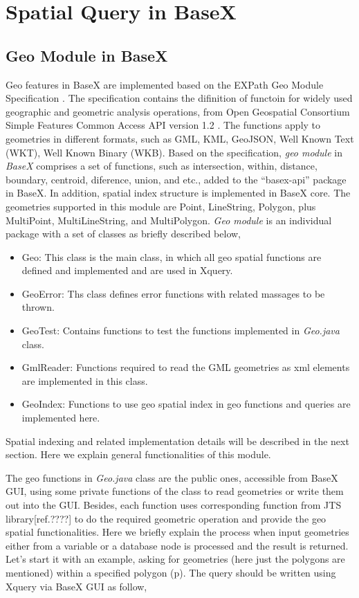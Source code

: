 \documentclass[a4paper,12pt]{article}
\begin{document}
\section{Spatial Query in BaseX}
\subsection{Geo Module in BaseX}
Geo features in BaseX are implemented based on the EXPath Geo Module Specification \cite{expath}. The specification contains the difinition of functoin for widely used geographic and geometric analysis operations, from Open Geospatial Consortium Simple Features Common Access API version 1.2 \cite{simpleFeature}. The functions apply to geometries in different formats, such as GML, KML, GeoJSON, Well Known Text (WKT), Well Known Binary (WKB). Based on the specification, \textit{geo module} in \textit{BaseX} comprises a set of functions, such as intersection, within, distance, boundary, centroid, diference, union, and etc., added to the “basex-api” package in BaseX. In addition, spatial index structure is implemented in BaseX core. The geometries supported in this module are Point, LineString, Polygon, plus MultiPoint, MultiLineString, and MultiPolygon. \textit{Geo module} is an individual package with a set of classes as briefly described below,
\begin{itemize}
\item Geo: This class is the main class, in which all geo spatial functions are defined and implemented and are used in Xquery.
\item GeoError: Ths class defines error functions with related massages to be thrown.
\item GeoTest: Contains functions to test the functions implemented in \textit{Geo.java} class.
\item GmlReader: Functions required to read the GML geometries as xml elements are implemented in this class.
\item GeoIndex: Functions to use geo spatial index in geo functions and queries are implemented here. 
\end{itemize}

Spatial indexing and related implementation details will be described in the next section. Here we explain general functionalities of this module.

The geo functions in \textit{Geo.java} class are the public ones, accessible from BaseX GUI, using some private functions of the class to read geometries or write them out into the GUI. Besides, each function uses corresponding function from JTS library[ref.????] to do the required geometric operation and provide the geo spatial functionalities. Here we briefly explain the process when input geometries either from a variable or a database node is processed and the result is returned.
Let's start it with an example, asking for geometries (here just the polygons are mentioned) within a specified polygon (p). The query should be written using Xquery via BaseX GUI as follow,
\end{document}
